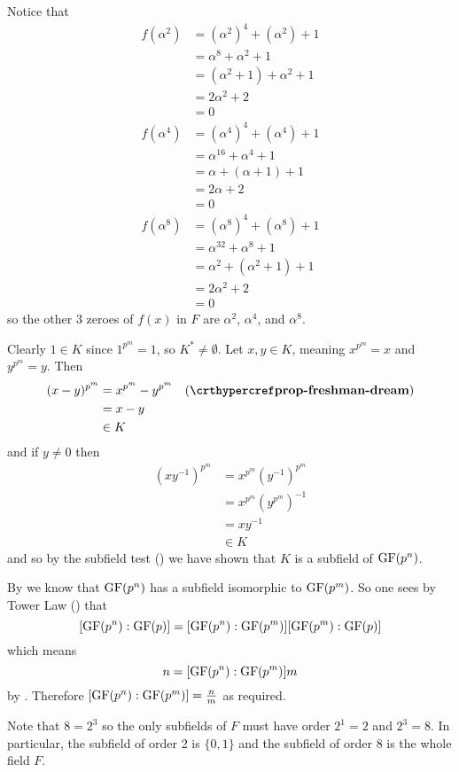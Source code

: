 \begin{questions}
    \item Notice that
    \begin{align*}
        f(\alpha^2) &= (\alpha^2)^4 + (\alpha^2) + 1\\
        &= \alpha^8 + \alpha^2 + 1\\
        &= (\alpha^2 + 1) + \alpha^2 + 1\\
        &= 2\alpha^2 + 2\\
        &= 0\\
        f(\alpha^4) &= (\alpha^4)^4 + (\alpha^4) + 1\\
        &= \alpha^{16} + \alpha^4 + 1\\
        &= \alpha + (\alpha + 1) + 1\\
        &= 2\alpha + 2\\
        &= 0\\
        f(\alpha^8) &= (\alpha^8)^4 + (\alpha^8) + 1\\
        &= \alpha^{32} + \alpha^8 + 1\\
        &= \alpha^2 + (\alpha^2 + 1) + 1\\
        &= 2\alpha^2 + 2\\
        &= 0
    \end{align*}
    so the other 3 zeroes of $f(x)$ in $F$ are $\alpha^2$, $\alpha^4$, and $\alpha^8$.

    \item Clearly $1 \in K$ since $1^{p^m} = 1$, so $K^\ast \neq \emptyset$. Let $x, y \in K$, meaning $x^{p^m} = x$ and $y^{p^m} = y$. Then
    \begin{align*}
        (x-y)^{p^m} &= x^{p^m} - y^{p^m} & (\myref{prop-freshman-dream})\\
        &= x - y\\
        &\in K
    \end{align*}
    and if $y \neq 0$ then
    \begin{align*}
        (xy^{-1})^{p^m} &= x^{p^m}\left(y^{-1}\right)^{p^m}\\
        &= x^{p^m}\left(y^{p^m}\right)^{-1}\\
        &= xy^{-1}\\
        &\in K
    \end{align*}
    and so by the subfield test () we have shown that $K$ is a subfield of $\mathrm{GF}(p^n)$.

    \item By  we know that $\mathrm{GF}(p^n)$ has a subfield isomorphic to $\mathrm{GF}(p^m)$. So one sees by Tower Law () that
    \[
        [\mathrm{GF}(p^n):\mathrm{GF}(p)] = [\mathrm{GF}(p^n):\mathrm{GF}(p^m)][\mathrm{GF}(p^m):\mathrm{GF}(p)]
    \]
    which means
    \[
        n = [\mathrm{GF}(p^n):\mathrm{GF}(p^m)]m
    \]
    by . Therefore $[\mathrm{GF}(p^n):\mathrm{GF}(p^m)] = \frac nm$ as required.

    \item Note that $8 = 2^3$ so the only subfields of $F$ must have order $2^1 = 2$ and $2^3 = 8$. In particular, the subfield of order 2 is $\{0, 1\}$ and the subfield of order 8 is the whole field $F$.
\end{questions}

